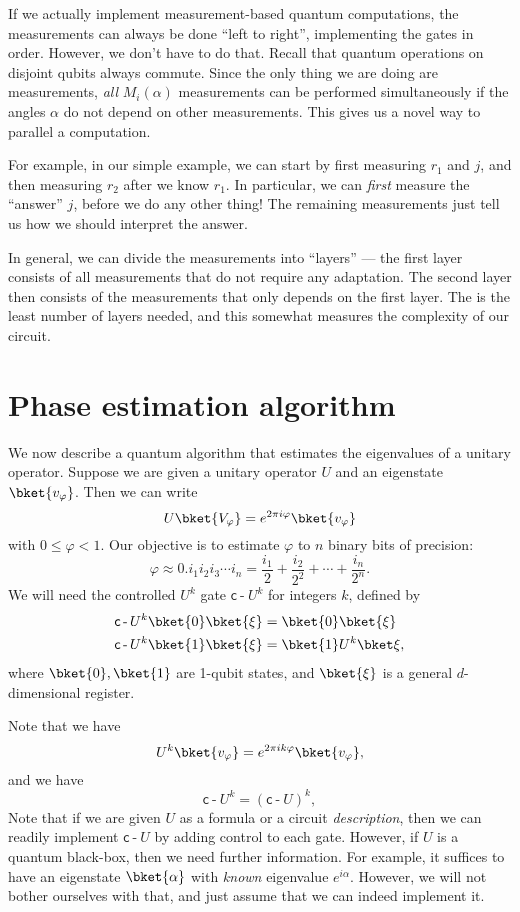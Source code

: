 \documentclass[a4paper]{article}
\newcommand{\qcd}{\mathsf{c}\operatorname{-}}
\begin{document}
If we actually implement measurement-based quantum computations, the measurements can always be done ``left to right'', implementing the gates in order. However, we don't have to do that. Recall that quantum operations on disjoint qubits always commute. Since the only thing we are doing are measurements, \emph{all} $M_i(\alpha)$ measurements can be performed simultaneously if the angles $\alpha$ do not depend on other measurements. This gives us a novel way to parallel a computation.

For example, in our simple example, we can start by first measuring $r_1$ and $j$, and then measuring $r_2$ after we know $r_1$. In particular, we can \emph{first} measure the ``answer'' $j$, before we do any other thing! The remaining measurements just tell us how we should interpret the answer.

In general, we can divide the measurements into ``layers'' --- the first layer consists of all measurements that do not require any adaptation. The second layer then consists of the measurements that only depends on the first layer. The  is the least number of layers needed, and this somewhat measures the complexity of our circuit.

\section{Phase estimation algorithm}
We now describe a quantum algorithm that estimates the eigenvalues of a unitary operator. Suppose we are given a unitary operator $U$ and an eigenstate $\bket{v_\varphi}$. Then we can write
\[
  U \bket{V_\varphi} = e^{2\pi i \varphi} \bket{v_\varphi}
\]
with $0 \leq \varphi < 1$. Our objective is to estimate $\varphi$ to $n$ binary bits of precision:
\[
  \varphi \approx 0.i_1 i_2 i_3 \cdots i_n = \frac{i_1}{2} + \frac{i_2}{2^2} + \cdots + \frac{i_n}{2^n}.
\]
We will need the controlled $U^k$ gate $\qcd U^k$ for integers $k$, defined by
\begin{align*}
  \qcd U^k\bket{0}\bket{\xi} &= \bket{0}\bket{\xi}\\
  \qcd U^k\bket{1}\bket{\xi} &= \bket{1} U^k\bket\xi,
\end{align*}
where $\bket{0}, \bket{1}$ are 1-qubit states, and $\bket{\xi}$ is a general $d$-dimensional register.

Note that we have
\[
  U^k \bket{v_\varphi} = e^{2\pi i k \varphi}\bket{v_\varphi},
\]
and we have
\[
  \qcd U^k = (\qcd U)^k,
\]
Note that if we are given $U$ as a formula or a circuit \emph{description}, then we can readily implement $\qcd U$ by adding control to each gate. However, if $U$ is a quantum black-box, then we need further information. For example, it suffices to have an eigenstate $\bket{\alpha}$ with \emph{known} eigenvalue $e^{i\alpha}$. However, we will not bother ourselves with that, and just assume that we can indeed implement it.
\end{document}
